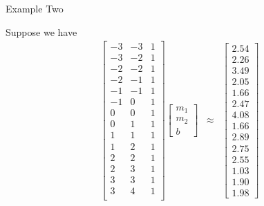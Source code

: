 \documentclass[svgnames,table,,aspectratio=169]{beamer}
\newcommand{\columnVector}[1]{%
  \left[
    \begin{array}{r}
    #1                           
    \end{array}
  \right]
}
\begin{document}
\begin{frame}{Example Two}

  Suppose we have
  \begin{eqnarray*}
    \left[
    \begin{array}{rrr}
      -3 & -3 & 1 \\
      -3 & -2 & 1 \\
      -2 & -2 & 1 \\
      -2 & -1 & 1 \\
      -1 & -1 & 1 \\
      -1 &  0 & 1 \\
       0 &  0 & 1 \\
       0 &  1 & 1 \\
       1 &  1 & 1 \\
       1 &  2 & 1 \\
       2 &  2 & 1 \\
       2 &  3 & 1 \\
       3 &  3 & 1 \\
       3 &  4 & 1 \\
    \end{array}
    \right]
    \columnVector{m_1 \\ m_2 \\ b}
    & \approx &
    \columnVector{2.54 \\ 2.26 \\ 3.49 \\ 2.05 \\ 1.66 \\ 2.47 \\ 4.08 \\
                  1.66 \\ 2.89 \\ 2.75 \\ 2.55 \\ 1.03 \\ 1.90 \\ 1.98 }
  \end{eqnarray*}
  
\end{frame}
\end{document}
